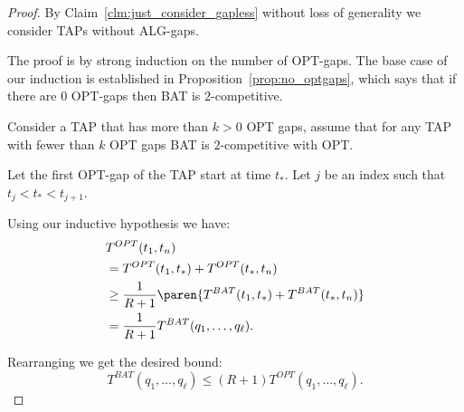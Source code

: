\begin{proof}
  By Claim~\ref{clm:just_consider_gapless} without loss of
  generality we consider TAPs without ALG-gaps.

  The proof is by strong induction on the number of OPT-gaps. 
  The base case of our induction is established in
  Proposition~\ref{prop:no_optgaps}, which says that if there are $0$
  OPT-gaps then BAT is $2$-competitive. 

  Consider a TAP that has more than $k > 0$ OPT gaps, assume that
  for any TAP with fewer than $k$ OPT gaps BAT is $2$-competitive
  with OPT.

  Let the first OPT-gap of the TAP start at time $t_*$.
  Let $j$ be an index such that $t_j < t_* < t_{j+1}$.

  Using our inductive hypothesis we have:
  \begin{align*}
  &T^{OPT}(t_1, t_n) \\
  &= T^{OPT}(t_1, t_*) + T^{OPT}(t_*, t_n)\\
  &\ge \frac{1}{R+1}\paren{T^{BAT}(t_1, t_*) + T^{BAT}(t_*, t_n)}\\
  &=\frac{1}{R+1} T^{BAT}(q_1, \ldots, q_\ell).
  \end{align*}

  Rearranging we get the desired bound:
  $$T^{BAT}(q_1, \ldots, q_\ell) \le (R+1) T^{OPT}(q_1, \ldots, q_\ell).$$
\end{proof}


